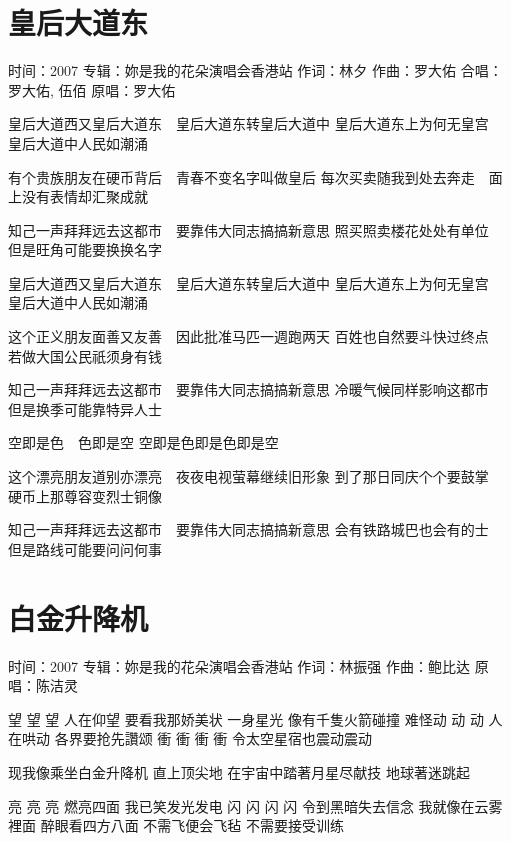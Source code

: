 \documentclass[UTF8,a4paper,oneside,twocolumn,12pt]{ctexbook}
\newcommand{\infopair}[2]{\textbullet #1：#2}
\newcommand{\zc}[1][伍佰]{\infopair{作词}{#1}}
\newcommand{\zq}[1][伍佰]{\infopair{作曲}{#1}}
\newcommand{\zj}[1]{\infopair{专辑}{#1}}
\newcommand{\yc}[1]{\infopair{原唱}{#1}}
\newcommand{\sj}[1]{\infopair{时间}{#1}}
\newenvironment{info}{\begin{flushleft}\kaishu
	}
	{\end{flushleft}\normalsize\yahei\par}
\newenvironment{lyric}{
	}
{}
\begin{document}
\section{皇后大道东}%
\begin{info}
	\sj{2007}
	\zj{妳是我的花朵演唱会香港站}
	\zc[林夕]
	\zq[罗大佑]
	\infopair{合唱}{罗大佑, 伍佰}
	\yc{罗大佑}
\end{info}
\begin{lyric}
	皇后大道西又皇后大道东　皇后大道东转皇后大道中
	皇后大道东上为何无皇宫　皇后大道中人民如潮涌

	有个贵族朋友在硬币背后　青春不变名字叫做皇后
	每次买卖随我到处去奔走　面上没有表情却汇聚成就

	知己一声拜拜远去这都市　要靠伟大同志搞搞新意思
	照买照卖楼花处处有单位　但是旺角可能要换换名字

	皇后大道西又皇后大道东　皇后大道东转皇后大道中
	皇后大道东上为何无皇宫　皇后大道中人民如潮涌

	这个正义朋友面善又友善　因此批准马匹一週跑两天
	百姓也自然要斗快过终点　若做大国公民祇须身有钱

	知己一声拜拜远去这都市　要靠伟大同志搞搞新意思
	冷暖气候同样影响这都市　但是换季可能靠特异人士

	空即是色　色即是空
	空即是色即是色即是空

	这个漂亮朋友道别亦漂亮　夜夜电视萤幕继续旧形象
	到了那日同庆个个要鼓掌　硬币上那尊容变烈士铜像

	知己一声拜拜远去这都市　要靠伟大同志搞搞新意思
	会有铁路城巴也会有的士　但是路线可能要问问何事
\end{lyric}

\section{白金升降机}%
\begin{info}
	\sj{2007}
	\zj{妳是我的花朵演唱会香港站}
	\zc[林振强]
	\zq[鲍比达]
	\yc{陈洁灵}
\end{info}
\begin{lyric}
	望 望 望 人在仰望 要看我那娇美状
	一身星光 像有千隻火箭碰撞
	难怪动 动 动 人在哄动 各界要抢先讚颂
	衝 衝 衝 衝 令太空星宿也震动震动

	现我像乘坐白金升降机 直上顶尖地
	在宇宙中踏著月星尽献技 地球著迷跳起

	亮 亮 亮 燃亮四面 我已笑发光发电
	闪 闪 闪 闪 令到黑暗失去信念
	我就像在云雾裡面 醉眼看四方八面
	不需飞便会飞毡 不需要接受训练
\end{lyric}
\end{document}
